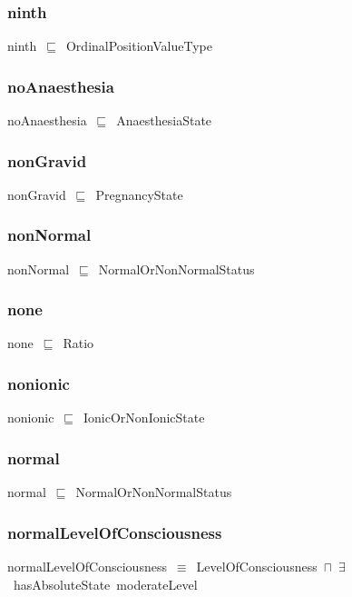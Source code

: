 \documentclass{article}
\begin{document}
\subsubsection*{ninth}

ninth~\ensuremath{\sqsubseteq}~OrdinalPositionValueType~

\subsubsection*{noAnaesthesia}

noAnaesthesia~\ensuremath{\sqsubseteq}~AnaesthesiaState~

\subsubsection*{nonGravid}

nonGravid~\ensuremath{\sqsubseteq}~PregnancyState~

\subsubsection*{nonNormal}

nonNormal~\ensuremath{\sqsubseteq}~NormalOrNonNormalStatus~

\subsubsection*{none}

none~\ensuremath{\sqsubseteq}~Ratio~

\subsubsection*{nonionic}

nonionic~\ensuremath{\sqsubseteq}~IonicOrNonIonicState~

\subsubsection*{normal}

normal~\ensuremath{\sqsubseteq}~NormalOrNonNormalStatus~

\subsubsection*{normalLevelOfConsciousness}

normalLevelOfConsciousness~\ensuremath{\equiv}~LevelOfConsciousness~\ensuremath{\sqcap}~\ensuremath{\exists}~hasAbsoluteState~moderateLevel
\end{document}
